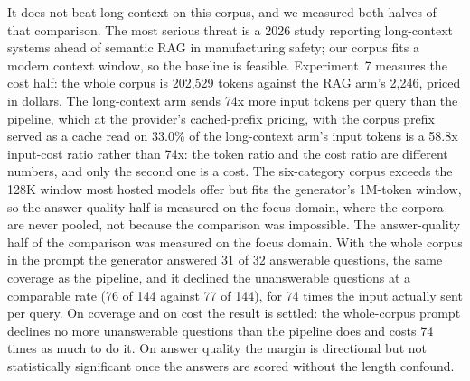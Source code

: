 \documentclass[conference]{IEEEtran}
\begin{document}
It does not beat long context on this corpus, and we measured both halves of that comparison. The most serious threat is a 2026 study reporting
long-context systems ahead of semantic RAG in manufacturing safety; our corpus
fits a modern context window, so the baseline is feasible. Experiment~7
measures the cost half: the whole corpus is 202,529 tokens against
the RAG arm's 2,246, priced in dollars. The long-context arm sends 74x more input tokens per query than the pipeline, which at the provider's cached-prefix pricing, with the corpus prefix served as a cache read on 33.0\% of the long-context arm's input tokens is a 58.8x input-cost ratio rather than 74x: the token ratio and the cost ratio are different numbers, and only the second one is a cost.
The six-category corpus exceeds the 128K window most hosted models offer but
fits the generator's 1M-token window, so the answer-quality half is measured on
the focus domain, where the corpora are never pooled, not because the
comparison was impossible. The answer-quality half of the comparison was measured on the focus domain. With the whole corpus in the prompt the generator answered 31 of 32 answerable questions, the same coverage as the pipeline, and it declined the unanswerable questions at a comparable rate (76 of 144 against 77 of 144), for 74 times the input actually sent per query. On coverage and on cost the result is settled: the whole-corpus prompt declines no more unanswerable questions than the pipeline does and costs 74 times as much to do it. On answer quality the margin is directional but not statistically significant once the answers are scored without the length confound.
\end{document}
